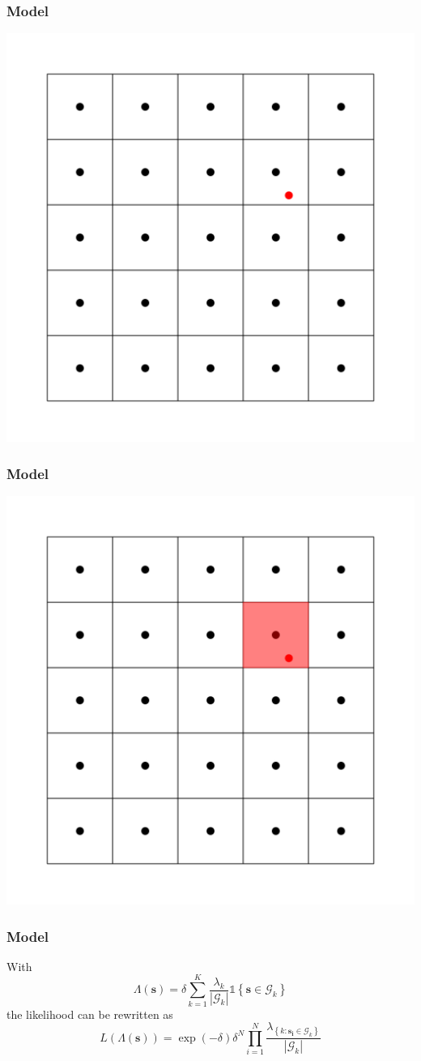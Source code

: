 \documentclass[10pt, compress]{beamer}
\begin{document}
  \begin{frame}
    \frametitle{Model}
    \centering
    \includegraphics[height=0.8\textheight]{grid_spot.pdf}
  \end{frame}
  \begin{frame}
    \frametitle{Model}
    \centering
    \includegraphics[height=0.8\textheight]{grid_spot_highlighted.pdf}
  \end{frame}
  \begin{frame}
    \frametitle{Model}
    With $$\Lambda(\mathbf{s}) = \delta \sum_{k=1}^K \frac{\lambda_k}{|\mathcal{G}_k|} \mathds{1} \left\{ \mathbf{s} \in \mathcal{G}_k \right\}$$
    the likelihood can be rewritten as
    $$L(\Lambda(\mathbf{s})) = \exp\left(-\delta\right) \delta^N \prod_{i=1}^{N}\frac{\lambda_{\left\{k: \mathbf{s_i} \in \mathcal{G}_k \right\}}}{|\mathcal{G}_k|}$$   
  \end{frame}
\end{document}
